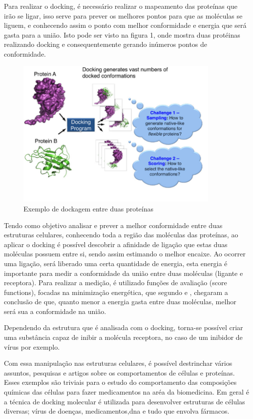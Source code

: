 \documentclass[tcc, capa]{texucpel}
\begin{document}
Para realizar o docking, é necessário realizar o mapeamento das proteínas que irão se ligar, isso serve para prever os melhores pontos para que as moléculas se liguem, e conhecendo assim o ponto com melhor conformidade e energia que será gasta para a união. Isto pode ser visto na figura 1, onde mostra duas protéinas realizando  docking e consequentemente gerando inúmeros pontos de conformidade.

      \begin{figure}[!htb]
	\centering
 \cite{xue2015protein}
    \caption{Exemplo de dockagem entre duas proteínas}
    \includegraphics[width=10cm]{imagens/mostra_docking.png}
	\end{figure}
    
Tendo como objetivo analisar e prever a melhor conformidade entre duas estruturas celulares, conhecendo toda a região das moléculas das proteínas, ao aplicar o docking é possível descobrir a afinidade de ligação que estas duas moléculas possuem entre si, sendo assim estimando o melhor encaixe.
Ao ocorrer uma ligação, será liberado uma certa quantidade de energia, esta energia é importante para medir a conformidade da união entre duas moléculas (ligante e receptora).
Para realizar a medição, é utilizado funções de avaliação (score functions), focadas na minimização energética, que  segundo \cite{kitchen2004docking} e \cite{lybrand1995ligand}, chegaram a conclusão de que, quanto menor a energia gasta entre duas moléculas, melhor será sua a conformidade na união. 

Dependendo da estrutura que é analisada com o docking, torna-se possível criar uma substância capaz de inibir a molécula receptora, no caso de um inibidor de vírus por exemplo. \cite{ishikawa2011binding}

Com essa manipulação nas estruturas celulares, é possível destrinchar vários assuntos, pesquisas e artigos sobre os comportamentos de células e proteínas.
Esses exemplos são triviais para o estudo do comportamento das composições químicas das células para fazer medicamentos na aréa da biomedicina. 
Em geral é a técnica de docking molecular é utilizada para desenvolver estruturas de células diversas; vírus de doenças, medicamentos,dna e tudo que envolva fármacos. 
\end{document}
